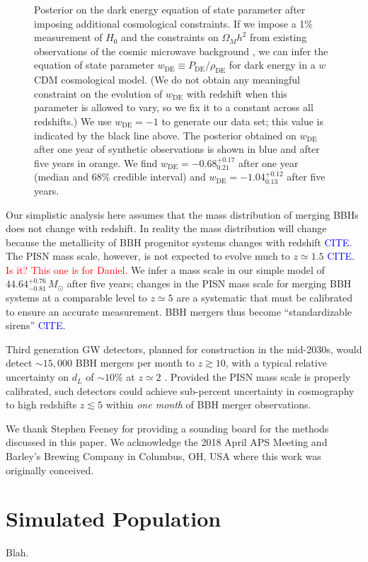\documentclass[modern]{aastex62}
\newcommand{\citationhere}{\textcolor{blue}{CITE}}
\newcommand{\fixme}[1]{\textcolor{red}{#1}}
\newcommand{\wDE}{w_\mathrm{DE}}
\newcommand{\MScaleFiveYear}{44.64^{+0.76}_{-0.81} \, \MSun{}}
\newcommand{\wDEOneYear}{-0.68^{+0.17}_{0.21}}
\newcommand{\wDEFiveYear}{-1.04^{+0.12}_{0.13}}
\newcommand{\MSun}{M_\odot}
\begin{document}
\begin{figure}
%
  \caption{\label{fig:wDE} Posterior on the dark energy equation of state
  parameter after imposing additional cosmological constraints.  If we impose a
  1\% measurement of $H_0$ \citep{Chen2017,Mortlock2018} and the constraints on
  $\Omega_M h^2$ from existing observations of the cosmic microwave background
  \citep{Planck2016}, we can infer the equation of state parameter $\wDE{}
  \equiv P_\mathrm{DE} / \rho_\mathrm{DE}$ for dark energy in a $w$CDM
  cosmological model.  (We do not obtain any meaningful constraint on the
  evolution of $\wDE{}$ with redshift when this parameter is allowed to vary, so
  we fix it to a constant across all redshifts.)  We use $\wDE{} = -1$ to
  generate our data set; this value is indicated by the black line above.  The
  posterior obtained on $\wDE{}$ after one year of synthetic observations is
  shown in blue and after five years in orange.  We find $\wDE{} =
  \wDEOneYear{}$ after one year (median and 68\% credible interval) and $\wDE{}
  = \wDEFiveYear{}$ after five years.}
%
\end{figure}

Our simplistic analysis here assumes that the mass distribution of merging
\acp{BBH} does not change with redshift.  In reality the mass distribution will
change because the metallicity of \ac{BBH} progenitor systems changes with
redshift \citationhere{}.  The \ac{PISN} mass scale, however, is not expected to
evolve much to $z \simeq 1.5$ \citationhere{}.  \fixme{Is it?  This one is for
Daniel.}  We infer a mass scale in our simple model of $\MScaleFiveYear{}$ after
five years; changes in the \ac{PISN} mass scale for merging \ac{BBH} systems at
a comparable level to $z \simeq 5$ are a systematic that must be calibrated to
ensure an accurate measurement.  \ac{BBH} mergers thus become ``standardizable
sirens'' \citationhere{}.

Third generation \ac{GW} detectors, planned for construction in the mid-2030s,
would detect $\sim 15,000$ \ac{BBH} mergers per month to $z \gtrsim 10$, with a
typical relative uncertainty on $d_L$ of $\sim 10 \%$ at $z \simeq 2$
\citep{Vitale2018}.  Provided the \ac{PISN} mass scale is properly calibrated,
such detectors could achieve sub-percent uncertainty in cosmography to high
redshifts $z \lesssim 5$ within \emph{one month} of \ac{BBH} merger
observations.

\acknowledgments

We thank Stephen Feeney for providing a sounding board for the methods discussed
in this paper.  We acknowledge the 2018 April APS Meeting and Barley's Brewing
Company in Columbus, OH, USA where this work was originally conceived.



\appendix

\section{Simulated Population}
\label{sec:simulated-population}

Blah.
\end{document}
